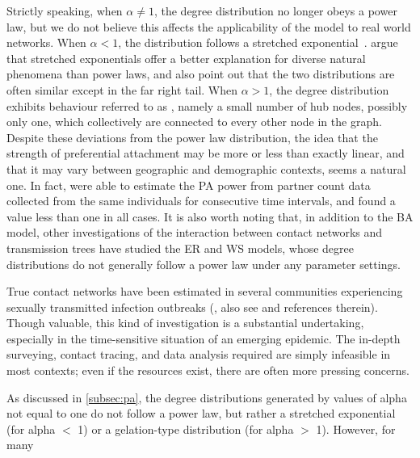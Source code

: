 Strictly speaking, when $\alpha \neq 1$, the degree distribution no longer
obeys a power law, but we do not believe this affects the applicability of the
model to real world networks. When $\alpha < 1$, the distribution follows a
stretched exponential~\autocite{krapivsky2000connectivity}.
\textcite{laherrere1998stretched} argue that stretched exponentials offer a
better explanation for diverse natural phenomena than power laws, and also
point out that the two distributions are often similar except in the far right
tail. When $\alpha > 1$, the degree distribution exhibits behaviour referred to
as , namely a small number of hub nodes, possibly only one,
which collectively are connected to every other node in the graph. Despite
these deviations from the power law distribution, the idea that the strength of
preferential attachment may be more or less than exactly linear, and that it
may vary between geographic and demographic contexts, seems a natural one.
In fact, \textcite{de2007preferential} were able to estimate the \acrlong{PA}
power from partner count data collected from the same individuals for
consecutive time intervals, and found a value less than one in all cases.  It
is also worth noting that, in addition to the \gls{BA} model, other
investigations of the interaction between contact networks and transmission
trees have studied the \gls{ER} and \gls{WS} models, whose degree distributions 
do not generally follow a power law under any parameter settings.

True contact networks have been estimated in several communities experiencing 
sexually transmitted infection outbreaks (\autocite{clemencon2015statistical},
also see \autocite{morris2011hiv, rothenberg2007large} and references therein).
Though valuable, this kind of investigation is a substantial undertaking,
especially in the time-sensitive situation of an emerging epidemic. The
in-depth surveying, contact tracing, and data analysis required are simply
infeasible in most contexts; even if the resources exist, there are often more
pressing concerns.

As discussed in \cref{subsec:pa}, the degree distributions generated by values
of \gls{alpha} not equal to one do not follow a power law, but rather a
stretched exponential (for \gls{alpha} $<$ 1) or a gelation-type distribution
(for \gls{alpha} $>$ 1). However, for many 


